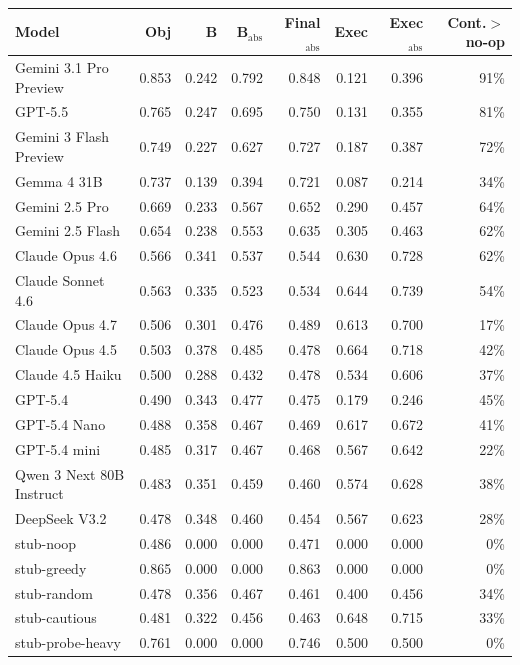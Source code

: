\begin{tabular}{lrrrrrrr}
\toprule
Model & Obj & B & B$_{\text{abs}}$ & Final$_{\text{abs}}$ & Exec & Exec$_{\text{abs}}$ & Cont.$>$no-op \\
\midrule
Gemini 3.1 Pro Preview & 0.853 & 0.242 & 0.792 & 0.848 & 0.121 & 0.396 & 91\% \\
GPT-5.5 & 0.765 & 0.247 & 0.695 & 0.750 & 0.131 & 0.355 & 81\% \\
Gemini 3 Flash Preview & 0.749 & 0.227 & 0.627 & 0.727 & 0.187 & 0.387 & 72\% \\
Gemma 4 31B & 0.737 & 0.139 & 0.394 & 0.721 & 0.087 & 0.214 & 34\% \\
Gemini 2.5 Pro & 0.669 & 0.233 & 0.567 & 0.652 & 0.290 & 0.457 & 64\% \\
Gemini 2.5 Flash & 0.654 & 0.238 & 0.553 & 0.635 & 0.305 & 0.463 & 62\% \\
Claude Opus 4.6 & 0.566 & 0.341 & 0.537 & 0.544 & 0.630 & 0.728 & 62\% \\
Claude Sonnet 4.6 & 0.563 & 0.335 & 0.523 & 0.534 & 0.644 & 0.739 & 54\% \\
Claude Opus 4.7 & 0.506 & 0.301 & 0.476 & 0.489 & 0.613 & 0.700 & 17\% \\
Claude Opus 4.5 & 0.503 & 0.378 & 0.485 & 0.478 & 0.664 & 0.718 & 42\% \\
Claude 4.5 Haiku & 0.500 & 0.288 & 0.432 & 0.478 & 0.534 & 0.606 & 37\% \\
GPT-5.4 & 0.490 & 0.343 & 0.477 & 0.475 & 0.179 & 0.246 & 45\% \\
GPT-5.4 Nano & 0.488 & 0.358 & 0.467 & 0.469 & 0.617 & 0.672 & 41\% \\
GPT-5.4 mini & 0.485 & 0.317 & 0.467 & 0.468 & 0.567 & 0.642 & 22\% \\
Qwen 3 Next 80B Instruct & 0.483 & 0.351 & 0.459 & 0.460 & 0.574 & 0.628 & 38\% \\
DeepSeek V3.2 & 0.478 & 0.348 & 0.460 & 0.454 & 0.567 & 0.623 & 28\% \\
stub-noop & 0.486 & 0.000 & 0.000 & 0.471 & 0.000 & 0.000 & 0\% \\
stub-greedy & 0.865 & 0.000 & 0.000 & 0.863 & 0.000 & 0.000 & 0\% \\
stub-random & 0.478 & 0.356 & 0.467 & 0.461 & 0.400 & 0.456 & 34\% \\
stub-cautious & 0.481 & 0.322 & 0.456 & 0.463 & 0.648 & 0.715 & 33\% \\
stub-probe-heavy & 0.761 & 0.000 & 0.000 & 0.746 & 0.500 & 0.500 & 0\% \\
\bottomrule
\end{tabular}
